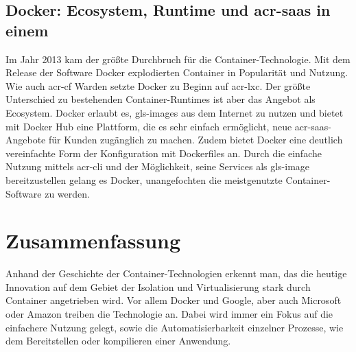 \subsection{Docker: Ecosystem, Runtime und \gls{acr-saas} in einem}
\label{sec:geschichteDocker}
Im Jahr 2013 kam der größte Durchbruch für die Container-Technologie. Mit dem Release der Software Docker explodierten Container in Popularität und Nutzung. Wie auch \gls{acr-cf} Warden setzte Docker zu Beginn auf \gls{acr-lxc}. Der größte Unterschied zu bestehenden Container-Runtimes ist aber das Angebot als Ecosystem. Docker erlaubt es, \glspl{gls-image} aus dem Internet zu nutzen und bietet mit Docker Hub eine Plattform, die es sehr einfach ermöglicht, neue \gls{acr-saas}-Angebote für Kunden zugänglich zu machen. Zudem bietet Docker eine deutlich vereinfachte Form der Konfiguration mit Dockerfiles an. Durch die einfache Nutzung mittels \gls{acr-cli} und der Möglichkeit, seine Services als \gls{gls-image} bereitzustellen gelang es Docker, unangefochten die meistgenutzte Container-Software zu werden.

\section{Zusammenfassung}
\label{sec:timeline}
Anhand der Geschichte der Container-Technologien erkennt man, das die heutige Innovation auf dem Gebiet der Isolation und Virtualisierung stark durch Container angetrieben wird. Vor allem Docker und Google, aber auch Microsoft oder Amazon treiben die Technologie an. Dabei wird immer ein Fokus auf die einfachere Nutzung gelegt, sowie die Automatisierbarkeit einzelner Prozesse, wie dem Bereitstellen oder kompilieren einer Anwendung.

